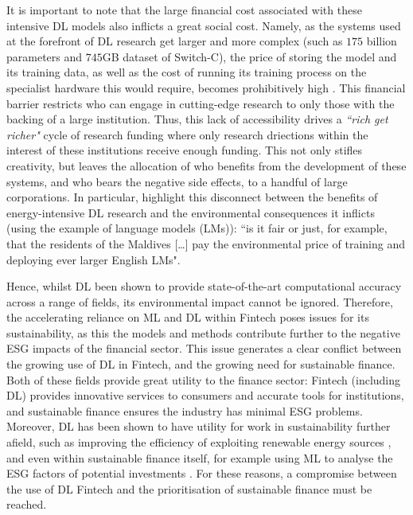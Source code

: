 \documentclass[a4paper, 11pt]{report}
\begin{document}
    It is important to note that the large financial cost associated with these intensive DL models also inflicts a great social cost. Namely, as the systems used at the forefront of DL research get larger and more complex (such as $175$ billion parameters and $745$GB dataset of  Switch-C), the price of storing the model and its training data, as well as the cost of running its training process on the specialist hardware this would require, becomes prohibitively high \citep{schwartz-2019}. This financial barrier restricts who can engage in cutting-edge research to only those with the backing of a large institution. Thus, this lack of accessibility drives a \emph{``rich get richer"} cycle of research funding \citep{strubell-2019} where only research driections within the interest of these institutions receive enough funding. This not only stifles creativity, but leaves the allocation of who benefits from the development of these systems, and who bears the negative side effects, to a handful of large corporations. In particular, \citet{bender-2021} highlight this disconnect between the benefits of energy-intensive DL research and the environmental consequences it inflicts (using the example of language models (LMs)): ``is it fair or just, for example, that the residents of the Maldives [\ldots] pay the environmental price of training and deploying ever larger English LMs".

    Hence, whilst DL been shown to provide state-of-the-art computational accuracy across a range of fields, its environmental impact cannot be ignored. Therefore, the accelerating reliance on ML and DL within Fintech poses issues for its sustainability, as this the models and methods contribute further to the negative ESG impacts of the financial sector. This issue generates a clear conflict between the growing use of DL in Fintech, and the growing need for sustainable finance. Both of these fields provide great utility to the finance sector: Fintech (including DL) provides innovative services to consumers and accurate tools for institutions, and sustainable finance ensures the industry has minimal ESG problems. Moreover, DL has been shown to have utility for work in sustainability further afield, such as improving the efficiency of exploiting renewable energy sources \citep{daniel-2021}, and even within sustainable finance itself, for example using ML to analyse the ESG factors of potential investments \citep{mehra-2022}. For these reasons, a compromise between the use of DL Fintech and the prioritisation of sustainable finance must be reached. 
\end{document}
